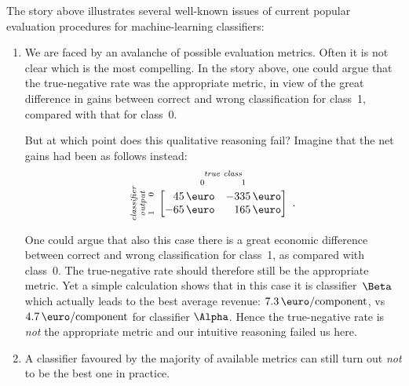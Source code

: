 \documentclass[\ifafour a4paper,12pt,\else a5paper,10pt,\fi%
onecolumn,oneside,article,%
british%
]{memoir}
\theoremstyle{remark}
\theoremstyle{innote}
\renewcommand*{\|}[1][]{\nonscript\:#1\vert\nonscript\:\mathopen{}}
\begin{document}
The story above illustrates several well-known issues of current popular evaluation procedures for machine-learning classifiers:
\begin{enumerate}%
\item We are faced by an avalanche of possible evaluation metrics. Often it is not clear which is the most compelling. In the story above, one could argue that the true-negative rate was the appropriate metric, in view of the great difference in gains between correct and wrong classification for class~1, compared with that for class~0.

  But at which point does this qualitative reasoning fail? Imagine that the net gains had been as follows instead:
\begin{equation}
  \label{eq:utility_example_2}
  \rotatebox[origin=c]{90}{
    \textit{\parbox{\widthof{\scriptsize classifier}}{\centering\scriptsize classifier\\output\\$1\hspace{1.5em}0$}}
    }\ 
    \overbracket[0pt]{
      \begin{bmatrix*}[r]
        45\,\text{\texteuro} & -335\,\text{\texteuro}  \\
        -65\,\text{\texteuro} & 165\,\text{\texteuro}
      \end{bmatrix*}}^{
      \textit{\parbox{\widthof{\scriptsize$0\hspace{4em}1$}}{\centering\scriptsize true class\\$0\hspace{4em}1$}}
    } \ .
\end{equation}
One could argue that also this case there is a great economic difference between correct and wrong classification for class~1, as compared with class~0. The true-negative rate should therefore still be the appropriate metric. Yet a simple calculation shows that in this case it is classifier~$\Beta$ which actually leads to the best average revenue: $7.3\,\text{\texteuro/component}$, vs $4.7\,\text{\texteuro/component}$ for classifier $\Alpha$. Hence the true-negative rate is \emph{not} the appropriate metric and our intuitive reasoning failed us here.


\item A classifier favoured by the majority of available metrics can still turn out \emph{not} to be the best one in practice.


\end{enumerate}
\end{document}
